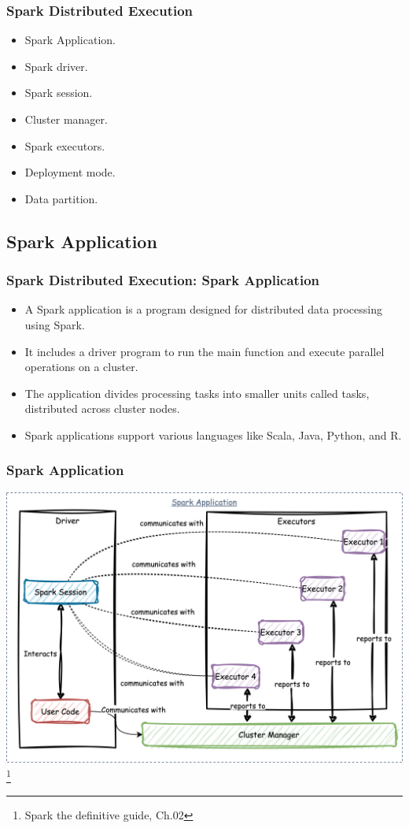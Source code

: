 \begin{frame}
    \frametitle{Spark Distributed Execution}
    \begin{itemize}
        \item Spark Application.
        \item Spark driver.
        \item Spark session.
        \item Cluster manager.
        \item Spark executors.
        \item Deployment mode.
        \item Data partition.
    \end{itemize}
\end{frame}


\subsection{Spark Application}\label{subsec:spark-application}
\begin{frame}
    \frametitle{Spark Distributed Execution: Spark Application}

    \begin{itemize}
        \item A Spark application is a program designed for distributed data processing using Spark.
        \item It includes a driver program to run the main function and execute parallel operations on a cluster.
        \item The application divides processing tasks into smaller units called tasks, distributed across cluster nodes.
        \item Spark applications support various languages like Scala, Java, Python, and R.
    \end{itemize}

\end{frame}

\begin{frame}
    \frametitle{Spark Application}

    \includegraphics[width=\textwidth,height=.75\textheight,keepaspectratio]{./Figures/chapter-04/SparkCourse.drawio}\footnote{Spark the definitive guide, Ch.02}

\end{frame}

